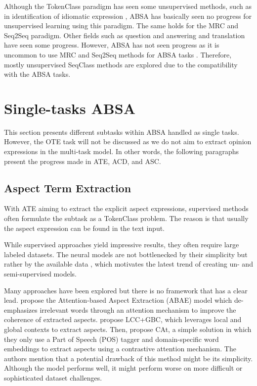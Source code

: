 \documentclass[american, oneside]{ecsgdp}
\begin{document}
Although the TokenClass paradigm has seen some unsupervised methods, such as in identification of idiomatic expression \parencite{Fazly2009UnsupervisedTokenClass}, ABSA has basically seen no progress for unsupervised learning using this paradigm. The same holds for the MRC and Seq2Seq paradigm. Other fields such as question and answering \parencite{Cui2020UnsupervisedMRC} and translation \parencite{Ramachandran2017UnsupervisedSeq2Seq} have seen some progress. However, ABSA has not seen progress as it is uncommon to use MRC and Seq2Seq methods for ABSA tasks \parencite{Zhang2022Survey}. Therefore, mostly unsupervised SeqClass methods are explored due to the compatibility with the ABSA tasks.

\section{Single-tasks ABSA} \label{sec:single}
This section presents different subtasks within ABSA handled as single tasks. However, the OTE task will not be discussed as we do not aim to extract opinion expressions in the multi-task model. In other words, the following paragraphs present the progress made in ATE, ACD, and ASC.

\subsection{Aspect Term Extraction} \label{sec:ATE}
With ATE aiming to extract the explicit aspect expressions, supervised methods often formulate the subtask as a TokenClass problem. The reason is that usually the aspect expression can be found in the text input.


While supervised approaches yield impressive results, they often require large labeled datasets. The neural models are not bottlenecked by their simplicity but rather by the available data \parencite{Huang2020JASen}, which motivates the latest trend of creating un- and semi-supervised models.  


Many approaches have been explored but there is no framework that has a clear lead. \textcite{He2017ABAE} propose the Attention-based Aspect Extraction (ABAE) model which de-emphasizes irrelevant words through an attention mechanism to improve the coherence of extracted aspects. \textcite{Liao2019LCC+GBC} propose LCC+GBC, which leverages local and global contexts to extract aspects. Then, \textcite{Tulkens2020CAt} propose CAt, a simple solution in which they only use a Part of Speech (POS) tagger and domain-specific word embeddings to extract aspects using a contrastive attention mechanism. The authors mention that a potential drawback of this method might be its simplicity. Although the model performs well, it might perform worse on more difficult or sophisticated dataset challenges. 
\end{document}
